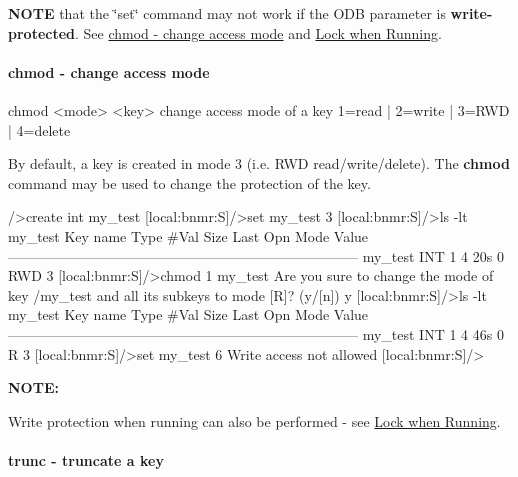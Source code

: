 \label{RC_odbedit_examples_RC_odbedit_set_wp}
\hypertarget{RC_odbedit_examples_RC_odbedit_set_wp}{}
 {\bfseries NOTE} that the \char`\"{}set\char`\"{} command may not work if the ODB parameter is {\bfseries write-\/protected}. See \hyperlink{RC_odbedit_examples_RC_odbedit_chmod}{chmod -\/ change access mode} and \hyperlink{RC_customize_ODB_RC_Lock_when_Running}{Lock when Running}.



\hypertarget{RC_odbedit_examples_RC_odbedit_chmod}{}\paragraph{chmod -\/ change access mode}\label{RC_odbedit_examples_RC_odbedit_chmod}

\begin{DoxyCode}
chmod <mode> <key>       change access mode of a key
                          1=read | 2=write | 3=RWD | 4=delete
\end{DoxyCode}


By default, a key is created in mode 3 (i.e. RWD read/write/delete). The {\bfseries chmod} command may be used to change the protection of the key. 
\begin{DoxyCode}
/>create int my_test
[local:bnmr:S]/>set my_test 3
[local:bnmr:S]/>ls -lt my_test
Key name                        Type    #Val  Size  Last Opn Mode Value
---------------------------------------------------------------------------
my_test                         INT     1     4     20s  0   RWD  3
[local:bnmr:S]/>chmod 1 my_test
Are you sure to change the mode of key
  /my_test
and all its subkeys
to mode [R]? (y/[n]) y
[local:bnmr:S]/>ls -lt my_test
Key name                        Type    #Val  Size  Last Opn Mode Value
---------------------------------------------------------------------------
my_test                         INT     1     4     46s  0   R    3
[local:bnmr:S]/>set my_test 6
Write access not allowed
[local:bnmr:S]/> 
\end{DoxyCode}


{\bfseries NOTE:} \par
 \par
Write protection when running can also be performed -\/ see \hyperlink{RC_customize_ODB_RC_Lock_when_Running}{Lock when Running}.



\hypertarget{RC_odbedit_examples_RC_odbedit_trunc}{}\paragraph{trunc  -\/ truncate a key}\label{RC_odbedit_examples_RC_odbedit_trunc}

